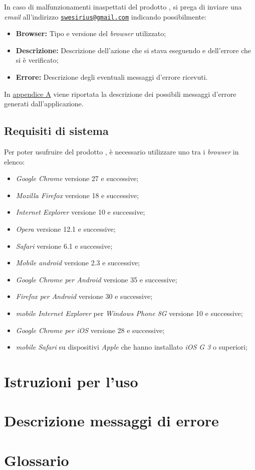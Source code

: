 In caso di malfunzionamenti inaspettati del prodotto \progetto{}, si prega di inviare una \textit{email} all'indirizzo
\href{mailto:swesirius@gmail.com}{\nolinkurl{swesirius@gmail.com}} indicando possibilmente:

\begin{itemize}
\item \textbf{Browser:} Tipo e versione del \textit{browser} utilizzato;
\item \textbf{Descrizione:} Descrizione dell'azione che si stava eseguendo e dell'errore che si è verificato;
\item \textbf{Errore:} Descrizione degli eventuali messaggi d'errore ricevuti.
\end{itemize}

In \hyperref[errori]{appendice A} viene riportata la descrizione dei possibili messaggi d'errore generati dall'applicazione.

\subsection{Requisiti di sistema}
Per poter usufruire del prodotto \progetto{}, è necessario utilizzare uno tra i \textit{browser} in elenco:
\begin{itemize}
\item \textit{Google Chrome} versione 27 e successive;
\item \textit{Mozilla Firefox} versione 18 e successive;
\item \textit{Internet Explorer} versione 10 e successive;
\item \textit{Opera} versione 12.1 e successive;
\item \textit{Safari} versione 6.1 e successive;
\item \textit{Mobile android} versione 2.3 e successive;
\item \textit{Google Chrome per Android} versione 35 e successive;
\item \textit{Firefox per Android} versione 30 e successive;
\item \textit{mobile Internet Explorer} per \textit{Windows Phone 8G} versione 10 e successive;
\item \textit{Google Chrome per iOS} versione 28 e successive;
\item \textit{mobile Safari} su dispositivi \textit{Apple} che hanno installato \textit{iOS G 3} o superiori;
\end{itemize}

\section{Istruzioni per l'uso}
\label{istruzioni}

\appendix
\section{Descrizione messaggi di errore}
\label{errori}

\section{Glossario}
\label{glossario}